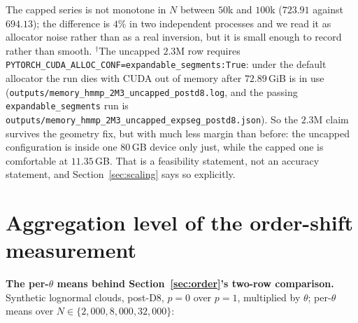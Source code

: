 \begin{table}[h]
\centering
\caption{Same measurement with the interaction list \emph{capped} at $2.5$M entries, post-D8. This is
a different configuration from Table~\ref{tab:mem}, not a continuation of it; the cap is what the
single-device $2.3$M runs used. Pre-D8 the same series ended at $3780.78$\,MB.}\label{tab:memdeep}
\end{table}

\noindent The capped series is not monotone in $N$ between $50$k and $100$k ($723.91$ against
$694.13$); the difference is $4\%$ in two independent processes and we read it as allocator noise
rather than as a real inversion, but it is small enough to record rather than smooth. $^{\dagger}$The
uncapped $2.3$M row requires \texttt{PYTORCH\_CUDA\_ALLOC\_CONF=expandable\_segments:True}: under the
default allocator the run dies with CUDA out of memory after $72.89$\,GiB is in use
(\texttt{outputs/\allowbreak memory\_\allowbreak hmmp\_\allowbreak 2M3\_\allowbreak uncapped\_\allowbreak postd8.\allowbreak log}, and the passing
\texttt{expandable\_segments} run is \texttt{outputs/\allowbreak memory\_\allowbreak hmmp\_\allowbreak 2M3\_\allowbreak uncapped\_\allowbreak expseg\_\allowbreak postd8.\allowbreak json}).
So the $2.3$M claim survives
the geometry fix, but with much less margin than before: the uncapped configuration is inside one
$80$\,GB device only just, while the capped one is comfortable at $11.35$\,GB. That is a feasibility
statement, not an accuracy statement, and Section~\ref{sec:scaling} says so explicitly.

\section{Aggregation level of the order-shift measurement}\label{app:percell}
\noindent\textbf{The per-$\theta$ means behind Section~\ref{sec:order}'s two-row comparison.}
Synthetic lognormal clouds, post-D8, $p{=}0$ over $p{=}1$, multiplied by $\theta$; per-$\theta$ means
over $N\in\{2{,}000,8{,}000,32{,}000\}$:

